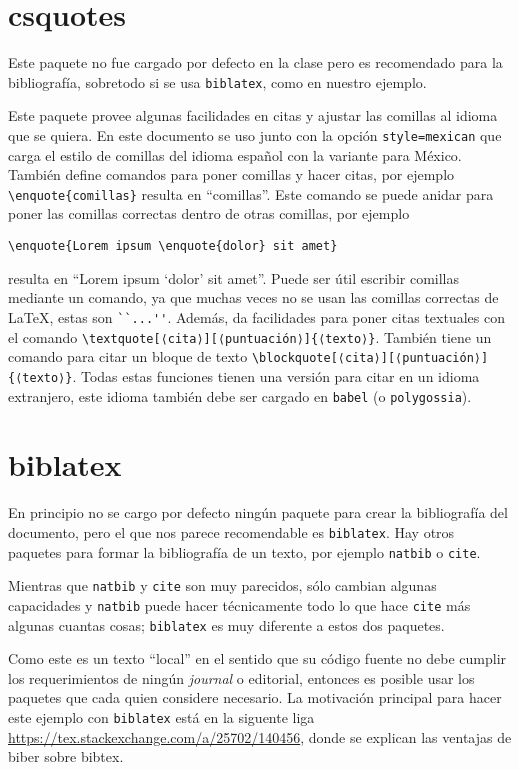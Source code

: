 \section{csquotes}%
\label{se:csq}
Este paquete no fue cargado por defecto en la clase pero es recomendado
para la bibliografía, sobretodo si se usa \texttt{biblatex}, como en nuestro
ejemplo.

Este paquete provee algunas facilidades en citas y ajustar las
comillas al idioma que se quiera. En este documento se uso junto con la
opción \texttt{style=mexican} que carga el estilo de comillas del idioma
español con la variante para México. También define comandos para poner
comillas y hacer citas, por ejemplo \verb|\enquote{comillas}| resulta en
\enquote{comillas}. Este comando se puede anidar para poner las comillas
correctas dentro de otras comillas, por ejemplo
\begin{flushleft}
  \verb|\enquote{Lorem ipsum \enquote{dolor} sit amet}|
\end{flushleft}
resulta en \enquote{Lorem ipsum \enquote{dolor} sit amet}. Puede ser útil
escribir comillas mediante un comando, ya que muchas veces no se usan las
comillas correctas de \LaTeX, estas son \verb|``...''|. Además, da
facilidades para poner citas textuales con el comando
\verb|\textquote[⟨cita⟩][⟨puntuación⟩]{⟨texto⟩}|. También tiene un comando
para citar un bloque de texto
\verb|\blockquote[⟨cita⟩][⟨puntuación⟩]{⟨texto⟩}|. Todas estas funciones
tienen una versión para citar en un idioma extranjero, este idioma también
debe ser cargado en \texttt{babel} (o \texttt{polygossia}).


\section{biblatex}%
\label{sec:bib}
En principio no se cargo por defecto ningún paquete para crear la
bibliografía del documento, pero el que nos parece recomendable es
\texttt{biblatex}. Hay otros paquetes para formar la bibliografía de un
texto, por ejemplo \texttt{natbib} o \texttt{cite}.

Mientras que \texttt{natbib} y \texttt{cite} son muy parecidos, sólo cambian
algunas capacidades y \texttt{natbib} puede hacer técnicamente todo lo que
hace \texttt{cite} más algunas cuantas cosas; \texttt{biblatex} es muy
diferente a estos dos paquetes.

Como este es un texto \enquote{local} en el sentido que su código fuente no
debe cumplir los requerimientos de ningún \textit{journal} o editorial,
entonces es posible usar los paquetes que cada quien considere necesario. La
motivación principal para hacer este ejemplo con \texttt{biblatex} está
en la siguente liga \url{https://tex.stackexchange.com/a/25702/140456},
donde se explican las ventajas de biber sobre bibtex.

